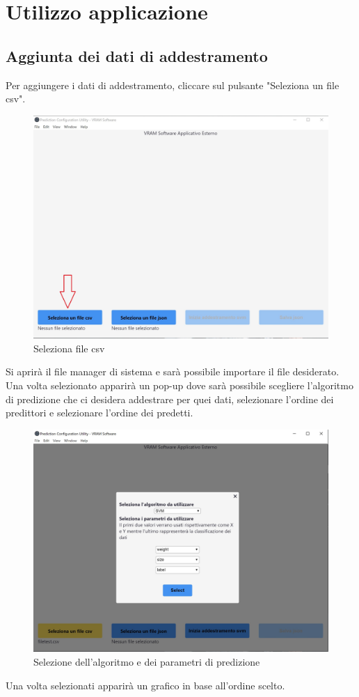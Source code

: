 \section{Utilizzo applicazione}
	\subsection{Aggiunta dei dati di addestramento}
	Per aggiungere i dati di addestramento, cliccare sul pulsante "Seleziona un file csv".
	\begin{figure}[H] 	
		\begin{center}
			\includegraphics[width=\linewidth]{img/1.jpg}
		\end{center}
		\caption{Seleziona file csv}	
	\end{figure}
	Si aprirà il file manager di sistema e sarà possibile importare il file desiderato. Una volta selezionato apparirà un pop-up dove sarà possibile scegliere l'algoritmo di predizione che ci desidera addestrare per quei dati, selezionare l'ordine dei predittori e selezionare l'ordine dei predetti.
	\begin{figure}[H] 	
		\begin{center}
			\includegraphics[width=\linewidth]{img/2.jpg}
		\end{center}
		\caption{Selezione dell'algoritmo e dei parametri di predizione}	
	\end{figure}
	Una volta selezionati apparirà un grafico in base all'ordine scelto.
